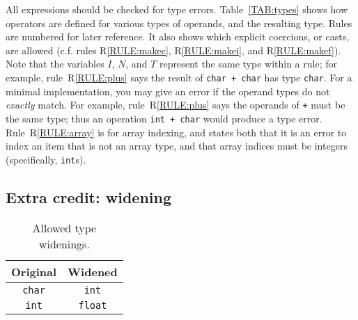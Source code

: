 \documentclass{article}
\newcounter{rule}
\begin{document}
All expressions should be checked for type errors.
Table~\ref{TAB:types} shows
how operators are defined for various types of operands,
and the resulting type.
Rules are numbered for later reference.
It also shows which explicit coercions, or casts, are allowed
(c.f. rules R\ref{RULE:makec}, R\ref{RULE:makei}, and R\ref{RULE:makef}).
Note that the variables $I$, $N$, and $T$ represent the same type
within a rule;
for example,
  rule~R\ref{RULE:plus} says the result of
  {\tt char + char} has type {\tt char}.
For a minimal implementation,
you may give an error if the operand types
do not \emph{exactly} match.
For example,
  rule~R\ref{RULE:plus} says the operands of {\tt +} must be
  the same type;
  thus an operation {\tt int + char} would produce a type error.
Rule~R\ref{RULE:array} is for array indexing,
and states both that
  it is an error to index an item that is not an array type,
  and that
  array indices must be integers (specifically, {\tt int}s).

%
%


\subsection{Extra credit: widening}
\label{SEC:widening}

\begin{table}[t]
\centering
  \begin{tabular}{c|c}
    Original & Widened \\ \hline
    {\tt char} & {\tt int} \\
    {\tt int}  & {\tt float}
  \end{tabular}
\caption{Allowed type widenings.} \label{TAB:widenings}
\end{table}
\end{document}
